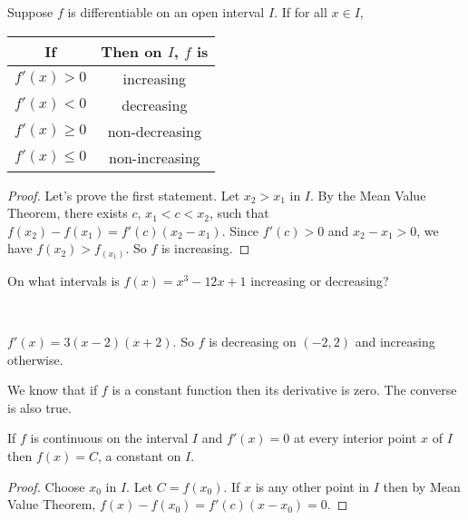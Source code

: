 \documentclass[../main.tex]{subfiles}
\begin{document}
  \begin{theorem}
    Suppose $f$ is differentiable on an open interval $I$. If for all $x \in I$,
    \begin{table}[H]
      \centering
      \begin{tabular}{|c|c|}
        \hline
        If & Then on $I$, $f$ is \\
        \hline
        $f'(x) > 0$ & increasing \\
        $f'(x) < 0$ & decreasing \\
        $f'(x) \ge 0$ & non-decreasing \\
        $f'(x) \le 0$ & non-increasing \\
        \hline
      \end{tabular}
    \end{table}

  \end{theorem}
  \begin{proof}
    Let's prove the first statement. Let $x_2 > x_1$ in $I$. By the Mean Value Theorem, there exists $c$, $x_1< c < x_2$, such that $f(x_2) - f(x_1) = f'(c) (x_2 - x_1)$. Since $f'(c)>0$  and $x_2-x_1>0$, we have $f(x_2) > f_(x_1)$. So $f$ is increasing.
  \end{proof}

  \begin{example}
    On what intervals is $f(x) = x^3 - 12 x + 1$ increasing or decreasing?
  \end{example}
  \begin{solution}
    ~\\
    \begin{minipage}{0.5\textwidth}
      $f'(x) = 3(x-2)(x+2)$. So $f$ is decreasing on $(-2, 2)$ and increasing otherwise.
    \end{minipage}%
    \begin{minipage}{0.5\textwidth}
      \begin{figure}[H]
        \centering
        
      \end{figure}
    \end{minipage}

  \end{solution}

  We know that if $f$ is a constant function then its derivative is zero. The converse is also true.
  \begin{theorem}
    If $f$ is continuous on the interval $I$ and $f'(x) = 0$ at every interior point $x$ of $I$ then $f(x) = C$, a constant on $I$.
  \end{theorem}
  \begin{proof}
    Choose $x_0$ in $I$. Let $C = f(x_0)$. If $x$ is any other point in $I$ then by Mean Value Theorem, $f(x) - f(x_0) = f'(c) (x-x_0) = 0$.
  \end{proof}
\end{document}
